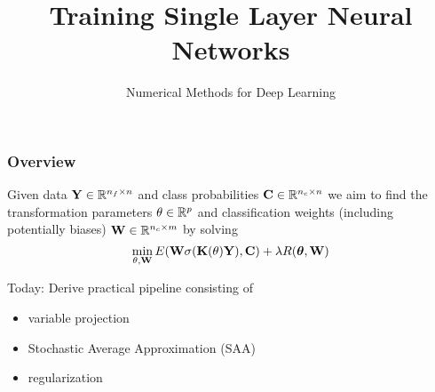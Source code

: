 \documentclass[12pt,fleqn]{beamer}
\title{Training Single Layer Neural Networks}
\subtitle{Numerical Methods for Deep Learning}
\date{}
\begin{document}
\makebeamertitle


\begin{frame}[fragile]\frametitle{Overview}

Given data ${\bf Y} \in \mathbb{R}^{n_f\times n}$ and class probabilities ${\bf C}\in\mathbb{R}^{n_c\times n}$ we aim to find the transformation parameters $\theta\in\mathbb{R}^p$ and classification weights (including potentially biases) ${\bf W} \in \mathbb{R}^{n_c \times m}$ by solving
$$
\min_{\theta,{\bf W}} E({\bf W} \sigma({\bf K}(\theta){\bf Y}), {\bf C}) + \lambda R({\boldsymbol \theta},{\bf W})
$$

Today: Derive practical pipeline consisting of 
\begin{itemize}
	\item variable projection
	\item Stochastic Average Approximation (SAA)
	\item regularization
\end{itemize}


\end{frame}
\end{document}
